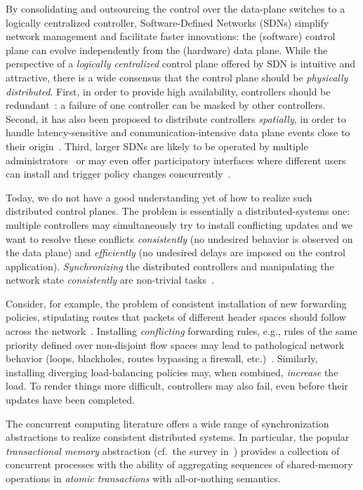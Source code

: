 \documentclass{sig-alternate-2006}
\begin{document}
By consolidating and outsourcing the control over the data-plane switches to a logically
centralized controller, Software-Defined Networks (SDNs)
simplify network management and facilitate faster innovations:
the (software) control plane can evolve independently from the
(hardware) data plane.
While the perspective of a \emph{logically centralized} control plane
offered by SDN is intuitive and attractive,
there is a wide consensus that
the control plane should be  \emph{physically distributed}.
First, in order to provide high availability,
controllers should be redundant~\cite{onix,onos,elasticon}: a failure
of one controller can be masked by other controllers.
Second, it has also been proposed to distribute controllers \emph{spatially}, in order to handle latency-sensitive and
communication-intensive
data plane
events close to their origin~\cite{devoflow,kandoo}.
Third, larger SDNs are likely to be operated by multiple administrators~\cite{infocom15} or may even offer
participatory interfaces where different users can install and trigger policy changes
concurrently~\cite{participatory}.

Today, we do not have a good understanding yet of how to realize
such distributed control planes. The problem is essentially a
distributed-systems
one: multiple controllers may simultaneously try to
install conflicting updates and we want to resolve these conflicts
\emph{consistently} (no undesired behavior is observed on the data
plane) and \emph{efficiently} (no undesired delays are imposed on the
control application).
\emph{Synchronizing}
the distributed controllers and manipulating the network state \emph{consistently}
are non-trivial tasks~\cite{sharon}.

Consider, for example, the problem of
consistent installation of new forwarding policies, stipulating routes
that packets of different header spaces should follow across the
network~\cite{network-update,roger-hotnets,podc15}.
Installing \emph{conflicting} forwarding rules, e.g., rules of the same priority defined over non-disjoint
flow spaces may lead to pathological network behavior (loops,
blackholes, routes bypassing a firewall, etc.)~\cite{hotnets14update,roger-hotnets}.
Similarly, installing diverging load-balancing policies may,
when combined, \emph{increase} the load.
To render things more difficult, controllers may also fail,
even before their updates have been completed.

The concurrent computing literature offers
a wide range of synchronization abstractions
to realize consistent distributed systems.
In particular, the popular 
\emph{transactional  memory} abstraction (cf.~the survey in~\cite{tm-book})
provides a
collection of
concurrent processes with the ability of aggregating sequences of
shared-memory operations in \emph{atomic  transactions} with
all-or-nothing semantics.
\end{document}

